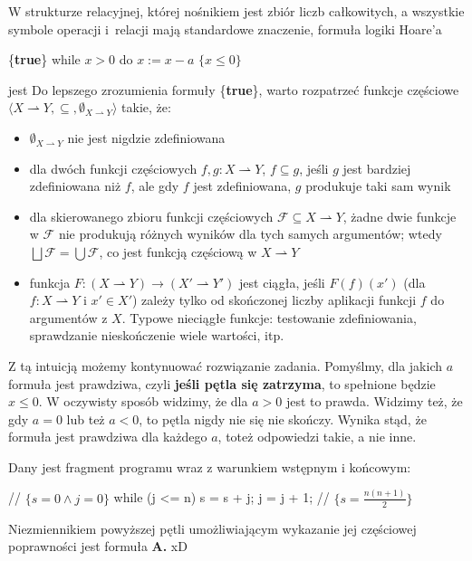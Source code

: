 \begin{solutions}
    \sol W strukturze relacyjnej, której nośnikiem jest zbiór liczb całkowitych, a wszystkie symbole operacji i~relacji mają standardowe znaczenie, formuła logiki Hoare'a
    \begin{center}
        \{\textbf{true}\} while $x > 0$ do $x := x - a$ $\{x \leq 0\}$
    \end{center}
    jest
    Do lepszego zrozumienia formuły \{\textbf{true}\}, warto rozpatrzeć funkcje częściowe $\langle X\rightharpoonup Y,\subseteq,\emptyset_{X\rightharpoonup Y}\rangle$ takie, że:
    \begin{itemize}
        \item $\emptyset_{X\rightharpoonup Y}$ nie jest nigdzie zdefiniowana
        \item dla dwóch funkcji częściowych $f,g:X\rightharpoonup Y$, $f\subseteq g$, jeśli $g$ jest bardziej zdefiniowana niż $f$, ale gdy $f$ jest zdefiniowana, $g$ produkuje taki sam wynik
        \item dla skierowanego zbioru funkcji częściowych $\mathcal{F}\subseteq X\rightharpoonup Y$, żadne dwie funkcje w $\mathcal{F}$ nie produkują różnych wyników dla tych samych argumentów; wtedy $\bigsqcup\mathcal{F}=\bigcup\mathcal{F}$, co jest funkcją częściową w $X\rightharpoonup Y$
        \item funkcja $F:(X\rightharpoonup Y)\to(X'\rightharpoonup Y')$ jest ciągła, jeśli $F(f)(x')$ (dla $f:X\rightharpoonup Y$ i $x'\in X'$) zależy tylko od skończonej liczby aplikacji funkcji $f$ do argumentów z $X$. Typowe nieciągłe funkcje: testowanie zdefiniowania, sprawdzanie nieskończenie wiele wartości, itp.
    \end{itemize}
    Z tą intuicją możemy kontynuować rozwiązanie zadania. Pomyślmy, dla jakich $a$ formuła jest prawdziwa, czyli \textbf{jeśli pętla się zatrzyma}, to spełnione będzie $x\leq0$. W oczywisty sposób widzimy, że dla $a>0$ jest to prawda. Widzimy też, że gdy $a=0$ lub też $a<0$, to pętla nigdy nie się nie skończy. Wynika stąd, że formuła jest prawdziwa dla każdego $a$, toteż odpowiedzi takie, a nie inne.

    \sol Dany jest fragment programu wraz z warunkiem wstępnym i końcowym:
    \begin{cpp}
        // $\{s = 0 \land j = 0\}$
        while (j <= n) {
            s = s + j;
            j = j + 1;
        }
        // $\{s = \frac{n(n + 1)}{2}\}$
    \end{cpp}
    Niezmiennikiem powyższej pętli umożliwiającym wykazanie jej częściowej poprawności jest formuła
    \textbf{A.} xD


\end{solutions}
